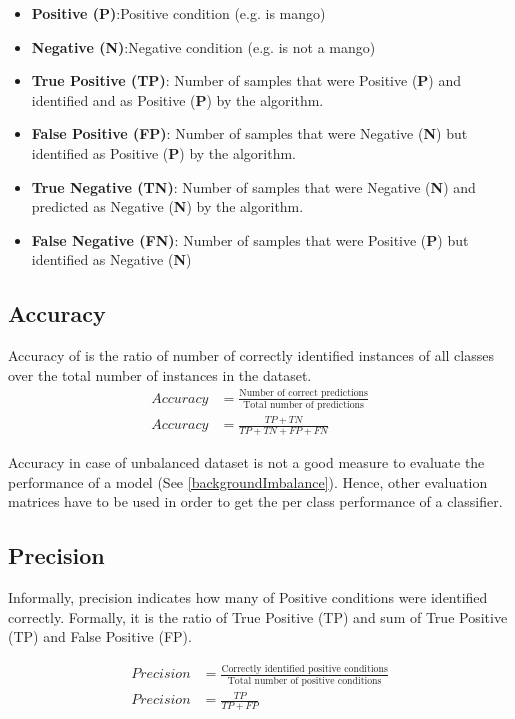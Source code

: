 \begin{itemize}
    \item \textbf{Positive (P)}:Positive condition (e.g. is mango)
    \item \textbf{Negative (N)}:Negative condition (e.g. is not a mango)
    \item \textbf{True Positive (TP)}: Number of samples that were Positive  (\textbf{P}) and identified and as Positive (\textbf{P}) by the algorithm.
    \item \textbf{False Positive (FP)}: Number of samples that were Negative (\textbf{N}) but identified as Positive  (\textbf{P}) by the algorithm.
    \item \textbf{True Negative (TN)}: Number of samples that were Negative (\textbf{N}) and predicted as Negative (\textbf{N}) by the algorithm.
    \item \textbf{False Negative (FN)}: Number of samples that were Positive (\textbf{P}) but identified as Negative (\textbf{N})
\end{itemize}


\subsection*{Accuracy}
Accuracy of is the ratio of number of correctly identified instances of all classes over the total number of instances in the dataset. 
\begin{align}
    Accuracy &= \frac{\text{Number of correct predictions}}{\text{Total number of predictions}}\\
    Accuracy &= \frac{TP+TN}{TP+TN+FP+FN}
\end{align}

Accuracy in case of unbalanced dataset is not a good measure to evaluate the performance of a model (See \ref{backgroundImbalance}). Hence, other evaluation matrices have to be used in order to get the per class performance of a classifier.

\subsection*{Precision}
Informally, precision indicates how many of Positive conditions were identified correctly. Formally, it is the ratio of True Positive (TP) and sum of True Positive (TP) and False Positive (FP).

\begin{align}
    Precision &= \frac{\text{Correctly identified positive conditions}}{\text{Total number of positive conditions}}\\
    Precision &= \frac{TP}{TP+FP}
\end{align}

